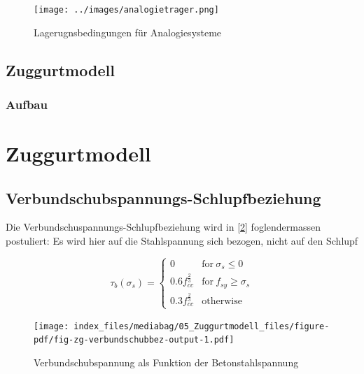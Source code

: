 \documentclass[
  12pt,
  letterpaper,
  egregdoesnotlikesansseriftitles]{scrreprt}
\begin{document}
\begin{figure}[H]

{\centering \texttt{[image: ../images/analogietrager.png]}

}

\caption{\label{fig-randbedingungen_analogiesysteme}Lagerugnsbedingungen
für Analogiesysteme}

\end{figure}

\hypertarget{zuggurtmodell}{%
\section{Zuggurtmodell}\label{zuggurtmodell}}

\hypertarget{aufbau-2}{%
\subsection{Aufbau}\label{aufbau-2}}


\hypertarget{zuggurtmodell-1}{%
\chapter{Zuggurtmodell}\label{zuggurtmodell-1}}

\hypertarget{verbundschubspannungs-schlupfbeziehung}{%
\section{Verbundschubspannungs-Schlupfbeziehung}\label{verbundschubspannungs-schlupfbeziehung}}

Die Verbundschuspannungs-Schlupfbeziehung wird in
{[}\protect\hyperlink{ref-Spathelf2022}{2}{]} foglendermassen
postuliert: Es wird hier auf die Stahlspannung sich bezogen, nicht auf
den Schlupf

\begin{equation}\tau_{b}{\left(\sigma_{s} \right)} = \begin{cases} 0 & \text{for}\: \sigma_{s} \leq 0 \\0.6 f_{cc}^{\frac{2}{3}} & \text{for}\: f_{sy} \geq \sigma_{s} \\0.3 f_{cc}^{\frac{2}{3}} & \text{otherwise} \end{cases}\end{equation}

\begin{figure}[H]

{\centering \texttt{[image: index\_files/mediabag/05\_Zuggurtmodell\_files/figure-pdf/fig-zg-verbundschubbez-output-1.pdf]}

}

\caption{\label{fig-zg-verbundschubbez}Verbundschubspannung als Funktion
der Betonstahlspannung}

\end{figure}
\end{document}
